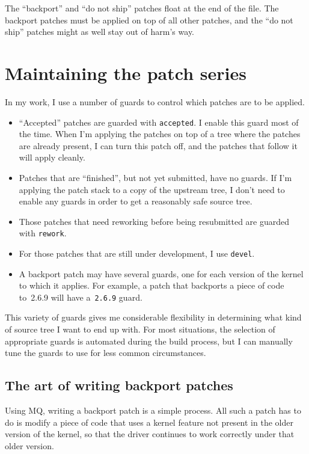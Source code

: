 The ``backport'' and ``do not ship'' patches float at the end of the
 file.  The backport patches must be applied on top
of all other patches, and the ``do not ship'' patches might as well
stay out of harm's way.

\section{Maintaining the patch series}

In my work, I use a number of guards to control which patches are to
be applied.

\begin{itemize}
\item ``Accepted'' patches are guarded with \texttt{accepted}.  I
  enable this guard most of the time.  When I'm applying the patches
  on top of a tree where the patches are already present, I can turn
  this patch off, and the patches that follow it will apply cleanly.
\item Patches that are ``finished'', but not yet submitted, have no
  guards.  If I'm applying the patch stack to a copy of the upstream
  tree, I don't need to enable any guards in order to get a reasonably
  safe source tree.
\item Those patches that need reworking before being resubmitted are
  guarded with \texttt{rework}.
\item For those patches that are still under development, I use
  \texttt{devel}.
\item A backport patch may have several guards, one for each version
  of the kernel to which it applies.  For example, a patch that
  backports a piece of code to~2.6.9 will have a~\texttt{2.6.9} guard.
\end{itemize}
This variety of guards gives me considerable flexibility in
determining what kind of source tree I want to end up with.  For most
situations, the selection of appropriate guards is automated during
the build process, but I can manually tune the guards to use for less
common circumstances.

\subsection{The art of writing backport patches}

Using MQ, writing a backport patch is a simple process.  All such a
patch has to do is modify a piece of code that uses a kernel feature
not present in the older version of the kernel, so that the driver
continues to work correctly under that older version.


